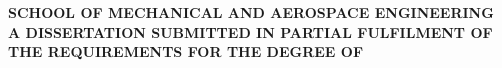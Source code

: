 \begin{titlepage}
\begin{center}
\vspace*{1.5in}
\Huge{\textbf{\thesistitle}}\\[2.0in]

\LARGE{\textbf{\MakeUppercase{\thesisauthor}}}\\[1in]

\normalsize{\textbf{\MakeUppercase{SCHOOL OF MECHANICAL AND AEROSPACE ENGINEERING}}}\\[0.5in]
\normalsize{\textbf{\MakeUppercase{A DISSERTATION SUBMITTED IN PARTIAL FULFILMENT OF\\THE REQUIREMENTS FOR THE DEGREE OF\\\degreeprogramme}}}\\[0.75in]


\large{\textbf{\submissionyear}}
\end{center}
\end{titlepage}
\newpage
